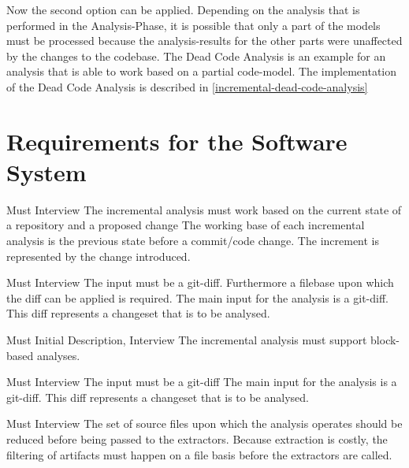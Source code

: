 \documentclass[a4paper]{article}
\begin{document}
Now the second option can be applied. Depending on the analysis that is performed in the Analysis-Phase, it is possible that only a part of the models must be processed because the analysis-results for the other parts were unaffected by the changes to the codebase. The Dead Code Analysis is an example for an analysis that is able to work based on a partial code-model. The implementation of the Dead Code Analysis  is described in \autoref{incremental-dead-code-analysis}


\clearpage
\section{Requirements for the Software System}

\begin{req}
	\reqtable
	{Must}  {Interview}
	{The incremental analysis must work based on the current state of a repository and a proposed change}
	{The working base of each incremental analysis is the previous state before a commit/code change. The increment is represented by the change introduced.}
	
	\begin{subreq} \label{req:git-diff}
		\reqtable
		{Must}  {Interview}
		{The input must be a git-diff. Furthermore a filebase upon which the diff can be applied is required.}
		{The main input for the analysis is a git-diff. This diff represents a changeset that is to be analysed.}
	\end{subreq}
\end{req}

\begin{req}
	\reqtable
	{Must}  {Initial Description, Interview}
	{The incremental analysis must support block-based analyses.}
	{}
	
	\begin{subreq} \label{req:git-diff}
		\reqtable
		{Must}  {Interview}
		{The input must be a git-diff}
		{The main input for the analysis is a git-diff. This diff represents a changeset that is to be analysed.}
	\end{subreq}
\end{req}


\begin{req} \label{req:early-filtering}
\reqtable
	{Must}  {Interview}
	{The set of source files upon which the analysis operates should be reduced before being passed to the extractors.}
	{Because extraction is costly, the filtering of artifacts must happen on a file basis before the extractors are called.}
\end{req}
\end{document}
